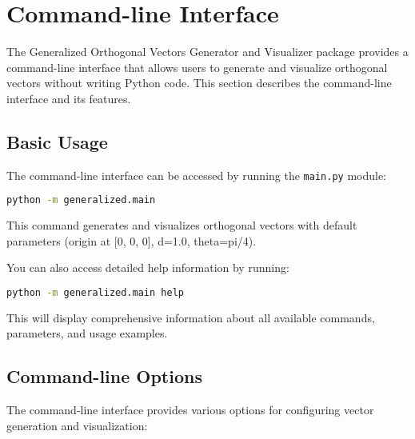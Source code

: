 \section{Command-line Interface}

The Generalized Orthogonal Vectors Generator and Visualizer package provides a command-line interface that allows users to generate and visualize orthogonal vectors without writing Python code. This section describes the command-line interface and its features.

\subsection{Basic Usage}

The command-line interface can be accessed by running the \texttt{main.py} module:

\begin{lstlisting}[language=bash]
python -m generalized.main
\end{lstlisting}

This command generates and visualizes orthogonal vectors with default parameters (origin at [0, 0, 0], d=1.0, theta=pi/4).

You can also access detailed help information by running:

\begin{lstlisting}[language=bash]
python -m generalized.main help
\end{lstlisting}

This will display comprehensive information about all available commands, parameters, and usage examples.

\subsection{Command-line Options}

The command-line interface provides various options for configuring vector generation and visualization:

